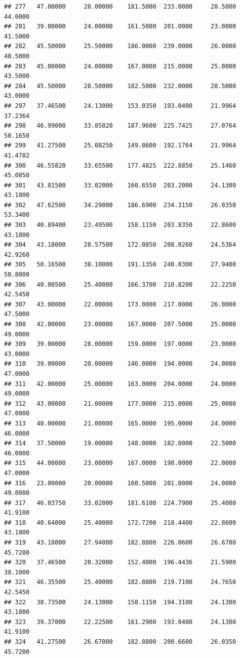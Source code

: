 \documentclass[]{article}
\begin{document}
\begin{verbatim}
## 277   47.00000     28.00000    181.5000  233.0000     28.5000       44.0000
## 281   39.00000     24.00000    161.5000  201.0000     23.0000       41.5000
## 282   45.50000     25.50000    186.0000  239.0000     26.0000       48.5000
## 283   45.00000     24.00000    167.0000  215.0000     25.0000       43.5000
## 284   45.50000     28.50000    182.5000  232.0000     28.5000       43.0000
## 297   37.46500     24.13000    153.0350  193.0400     21.9964       37.2364
## 298   46.99000     33.85820    187.9600  225.7425     27.0764       50.1650
## 299   41.27500     25.08250    149.8600  192.1764     21.9964       41.4782
## 300   46.55820     33.65500    177.4825  222.8850     25.1460       45.0850
## 301   43.81500     33.02000    160.6550  203.2000     24.1300       43.1800
## 302   47.62500     34.29000    186.6900  234.3150     26.0350       53.3400
## 303   40.89400     23.49500    158.1150  203.8350     22.8600       43.1800
## 304   43.18000     28.57500    172.0850  208.0260     24.5364       42.9260
## 305   50.16500     38.10000    191.1350  240.0300     27.9400       50.8000
## 306   40.00500     25.40000    166.3700  210.8200     22.2250       42.5450
## 307   43.00000     22.00000    173.0000  217.0000     26.0000       47.5000
## 308   42.00000     23.00000    167.0000  207.5000     25.0000       49.0000
## 309   39.00000     28.00000    159.0000  197.0000     23.0000       43.0000
## 310   39.00000     20.00000    146.0000  194.0000     24.0000       47.0000
## 311   42.00000     25.00000    163.0000  204.0000     24.0000       49.0000
## 312   43.00000     21.00000    177.0000  215.0000     25.0000       47.0000
## 313   40.00000     21.00000    165.0000  195.0000     24.0000       46.0000
## 314   37.50000     19.00000    148.0000  182.0000     22.5000       46.0000
## 315   44.00000     23.00000    167.0000  198.0000     22.0000       47.0000
## 316   23.00000     20.00000    160.5000  201.0000     24.0000       49.0000
## 317   46.03750     33.02000    181.6100  224.7900     25.4000       41.9100
## 318   40.64000     25.40000    172.7200  218.4400     22.8600       43.1800
## 319   43.18000     27.94000    182.8800  226.0600     26.6700       45.7200
## 320   37.46500     20.32000    152.4000  196.4436     21.5900       38.1000
## 321   46.35500     25.40000    182.8800  219.7100     24.7650       42.5450
## 322   38.73500     24.13000    158.1150  194.3100     24.1300       43.1800
## 323   39.37000     22.22500    161.2900  193.0400     24.1300       41.9100
## 324   41.27500     26.67000    182.8800  200.6600     26.0350       45.7200

\end{verbatim}
\end{document}
